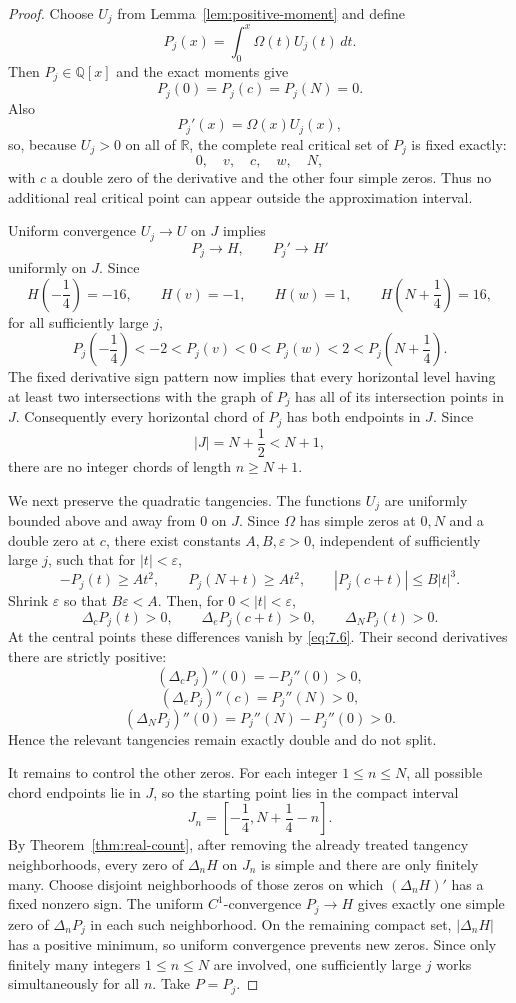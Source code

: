 \documentclass[11pt]{article}
\theoremstyle{definition}
\theoremstyle{remark}
\newcommand{\R}{\mathbb{R}}
\begin{document}
\begin{proof}
Choose \(U_j\) from Lemma~\ref{lem:positive-moment} and define
\[
P_j(x)=\int_0^x\Omega(t)U_j(t)\,dt.
\tag{7.5}\label{eq:Pj}
\]
Then \(P_j\in\mathbb Q[x]\) and the exact moments give
\[
P_j(0)=P_j(c)=P_j(N)=0.
\tag{7.6}\label{eq:7.6}
\]
Also
\[
P_j'(x)=\Omega(x)U_j(x),
\]
so, because \(U_j>0\) on all of \(\R\), the complete real critical set
of \(P_j\) is fixed exactly:
\[
0,\quad v,\quad c,\quad w,\quad N,
\]
with \(c\) a double zero of the derivative and the other four simple
zeros.  Thus no additional real critical point can appear outside the
approximation interval.

Uniform convergence \(U_j\to U\) on \(J\) implies
\[
P_j\to H,\qquad P_j'\to H'
\]
uniformly on \(J\).  Since
\[
H\!\left(-\frac14\right)=-16,\qquad
H(v)=-1,\qquad
H(w)=1,\qquad
H\!\left(N+\frac14\right)=16,
\]
for all sufficiently large \(j\),
\[
P_j\!\left(-\frac14\right)<-2<P_j(v)<0
<P_j(w)<2<P_j\!\left(N+\frac14\right).
\tag{7.7}
\]
The fixed derivative sign pattern now implies that every horizontal level
having at least two intersections with the graph of \(P_j\) has all of its
intersection points in \(J\).  Consequently every horizontal chord of
\(P_j\) has both endpoints in \(J\).  Since
\[
|J|=N+\frac12<N+1,
\]
there are no integer chords of length \(n\ge N+1\).

We next preserve the quadratic tangencies.  The functions \(U_j\) are
uniformly bounded above and away from \(0\) on \(J\).  Since \(\Omega\)
has simple zeros at \(0,N\) and a double zero at \(c\), there exist
constants \(A,B,\varepsilon>0\), independent of sufficiently large \(j\),
such that for \(|t|<\varepsilon\),
\[
-P_j(t)\ge At^2,\qquad
P_j(N+t)\ge At^2,\qquad
|P_j(c+t)|\le B|t|^3.
\]
Shrink \(\varepsilon\) so that \(B\varepsilon<A\).  Then, for
\(0<|t|<\varepsilon\),
\[
\Delta_cP_j(t)>0,\qquad
\Delta_eP_j(c+t)>0,\qquad
\Delta_NP_j(t)>0.
\tag{7.8}
\]
At the central points these differences vanish by \eqref{eq:7.6}.  Their
second derivatives there are strictly positive:
\[
(\Delta_cP_j)''(0)=-P_j''(0)>0,
\]
\[
(\Delta_eP_j)''(c)=P_j''(N)>0,
\]
\[
(\Delta_NP_j)''(0)=P_j''(N)-P_j''(0)>0.
\]
Hence the relevant tangencies remain exactly double and do not split.

It remains to control the other zeros.  For each integer \(1\le n\le N\),
all possible chord endpoints lie in \(J\), so the starting point lies in
the compact interval
\[
J_n=\left[-\frac14,N+\frac14-n\right].
\]
By Theorem~\ref{thm:real-count}, after removing the already treated
tangency neighborhoods, every zero of \(\Delta_nH\) on \(J_n\) is simple
and there are only finitely many.  Choose disjoint neighborhoods of those
zeros on which \((\Delta_nH)'\) has a fixed nonzero sign.  The uniform
\(C^1\)-convergence \(P_j\to H\) gives exactly one simple zero of
\(\Delta_nP_j\) in each such neighborhood.  On the remaining compact set,
\(|\Delta_nH|\) has a positive minimum, so uniform convergence prevents
new zeros.  Since only finitely many integers \(1\le n\le N\) are involved,
one sufficiently large \(j\) works simultaneously for all \(n\).
Take \(P=P_j\).
\end{proof}
\end{document}
